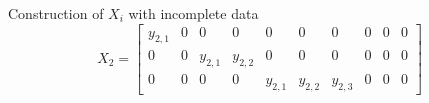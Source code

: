 \begin{example}{Construction of $X_i$ with incomplete data}
\begin{equation}
X_2 =  \begin{bmatrix} 
y_{2, 1}  & 	0  &	  0           &    0            &    0   & 0 & 0 & 0 & 0 & 0  \\
0   	      &  	0  &	y_{2, 1}  &    y_{2,2}   &    0   &  0 & 0 & 0 & 0 & 0 \\
 0   	      &        0  &    0           &    0            &  y_{2, 1}    & y_{2, 2}& y_{2, 3} &    0   & 0  & 0
\end{bmatrix}
\end{equation}
\end{example}



%
%
%
%
